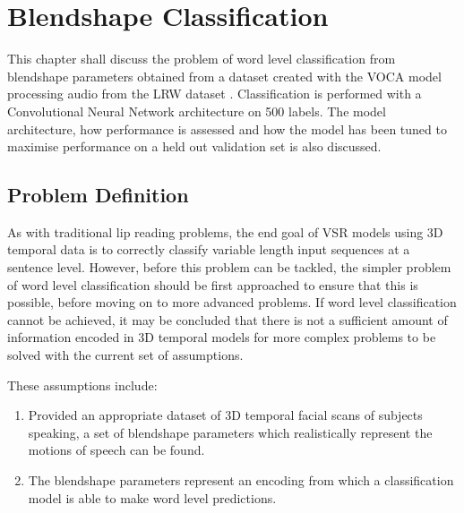 %
%
%
%
%





\chapter{Blendshape Classification}

This chapter shall discuss the problem of word level classification from blendshape parameters obtained from a dataset created with the VOCA model \cite{Cudeiro2019} processing audio from the LRW dataset \cite{Chung2016}.
Classification is performed with a Convolutional Neural Network architecture on 500 labels.
The model architecture, how performance is assessed and how the model has been tuned to maximise performance on a held out validation set is also discussed. 

\section{Problem Definition}
As with traditional lip reading problems, the end goal of VSR models using 3D temporal data is to correctly classify variable length input sequences at a sentence level.
However, before this problem can be tackled, the simpler problem of word level classification should be first approached to ensure that this is possible, before moving on to more advanced problems.
If word level classification cannot be achieved, it may be concluded that there is not a sufficient amount of information encoded in 3D temporal models for more complex problems to be solved with the current set of assumptions.

These assumptions include:
\begin{enumerate}
    \item Provided an appropriate dataset of 3D temporal facial scans of subjects speaking, a set of blendshape parameters which realistically represent the motions of speech can be found. \label{assumption:class_1}
    \item The blendshape parameters represent an encoding from which a classification model is able to make word level predictions. \label{assumption:class_2}
\end{enumerate}

